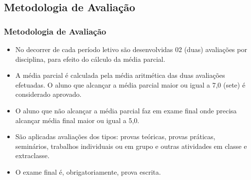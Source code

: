 \subsection[Metodologia de Avaliação]{Metodologia de Avaliação}\label{subsec:plano-ensino-avaliacao}



\begin{frame}[t]\frametitle{Metodologia de Avaliação}

  \begin{itemize}
    \justifying{}
    \setlength\itemsep{1em}
    \item No decorrer de cada período letivo são desenvolvidas 02 (duas) avaliações por disciplina, para efeito do cálculo da média parcial.
    \item A média parcial é calculada pela média aritmética das duas avaliações efetuadas. O aluno que alcançar a média parcial maior ou igual a 7,0 (sete) é considerado aprovado.
    \item O aluno que não alcançar a média parcial faz em exame final onde precisa alcançar média final maior ou igual a 5,0.
    \item São aplicadas avaliações dos tipos: provas teóricas, provas práticas, seminários, trabalhos individuais ou em grupo e outras atividades em classe e extraclasse.
    \item O exame final é, obrigatoriamente, prova escrita.
  \end{itemize}

\end{frame}



